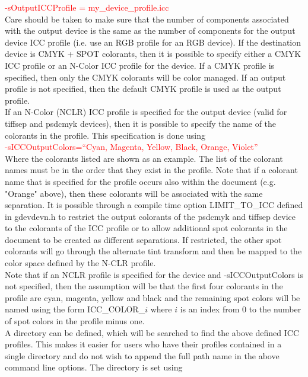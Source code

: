 \documentclass[12pt,notitlepage]{article}
\begin{document}
\textcolor{red}{-sOutputICCProfile = my\_device\_profile.icc}\\

 \noindent Care should be taken to make sure that the number of components associated with the output device is the same as the number of components for the output device ICC profile (i.e. use an RGB profile for an RGB device).  If the destination device is CMYK + SPOT colorants, then it is possible to specify either a CMYK ICC profile or an N-Color ICC profile for the device.  If a CMYK profile is specified, then only the CMYK colorants will be color managed.  If an output profile is not specified, then the default CMYK profile is used as the output profile.\\

 If an N-Color (NCLR) ICC profile is specified for the output device (valid for tiffsep and psdcmyk devices), then it is possible to specify the name of the colorants in the profile.   This specification is done using\\

\textcolor{red}{-sICCOutputColors=``Cyan, Magenta, Yellow, Black, Orange, Violet''}\\

 \noindent Where the colorants listed are shown as an example.  The list of the colorant names must be in the order that they exist in the profile.  Note that if a colorant name that is specified for the profile occurs also within the document (e.g. "Orange" above), then these colorants will be associated with the same separation. It is possible through a compile time option LIMIT\_TO\_ICC defined in gdevdevn.h to restrict the output colorants of the psdcmyk and tiffsep device to the colorants of the ICC profile or to allow additional spot colorants in the document to be created as different separations. If restricted, the other spot colorants will go through the alternate tint transform and then be mapped to the color space defined by the N-CLR profile.\\

 Note that if an NCLR profile is specified for the device and -sICCOutputColors is not specified, then the assumption will be that the first four colorants in the profile are cyan, magenta, yellow and black and the remaining spot colors will be named using the form ICC\_COLOR\_$i$ where $i$ is an index from 0 to the number of spot colors in the profile minus one.\\

A directory can be defined, which will be searched to find the above defined ICC profiles.  This makes it easier for users who have their profiles contained in a single directory and do not wish to append the full path name in the above command line options.  The directory is set using\\
\end{document}
